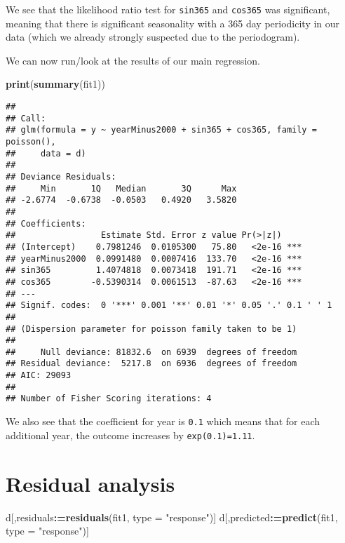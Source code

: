 \documentclass[]{book}
\newenvironment{Shaded}{\begin{snugshade}}{\end{snugshade}}
\newcommand{\KeywordTok}[1]{\textcolor[rgb]{0.13,0.29,0.53}{\textbf{#1}}}
\newcommand{\DataTypeTok}[1]{\textcolor[rgb]{0.13,0.29,0.53}{#1}}
\newcommand{\StringTok}[1]{\textcolor[rgb]{0.31,0.60,0.02}{#1}}
\newcommand{\OperatorTok}[1]{\textcolor[rgb]{0.81,0.36,0.00}{\textbf{#1}}}
\newcommand{\ErrorTok}[1]{\textcolor[rgb]{0.64,0.00,0.00}{\textbf{#1}}}
\newcommand{\NormalTok}[1]{#1}
\begin{document}
We see that the likelihood ratio test for \texttt{sin365} and
\texttt{cos365} was significant, meaning that there is significant
seasonality with a 365 day periodicity in our data (which we already
strongly suspected due to the periodogram).

\newpage

We can now run/look at the results of our main regression.

\begin{Shaded}
\begin{Highlighting}[]
\KeywordTok{print}\NormalTok{(}\KeywordTok{summary}\NormalTok{(fit1))}
\end{Highlighting}
\end{Shaded}

\begin{verbatim}
## 
## Call:
## glm(formula = y ~ yearMinus2000 + sin365 + cos365, family = poisson(), 
##     data = d)
## 
## Deviance Residuals: 
##     Min       1Q   Median       3Q      Max  
## -2.6774  -0.6738  -0.0503   0.4920   3.5820  
## 
## Coefficients:
##                 Estimate Std. Error z value Pr(>|z|)    
## (Intercept)    0.7981246  0.0105300   75.80   <2e-16 ***
## yearMinus2000  0.0991480  0.0007416  133.70   <2e-16 ***
## sin365         1.4074818  0.0073418  191.71   <2e-16 ***
## cos365        -0.5390314  0.0061513  -87.63   <2e-16 ***
## ---
## Signif. codes:  0 '***' 0.001 '**' 0.01 '*' 0.05 '.' 0.1 ' ' 1
## 
## (Dispersion parameter for poisson family taken to be 1)
## 
##     Null deviance: 81832.6  on 6939  degrees of freedom
## Residual deviance:  5217.8  on 6936  degrees of freedom
## AIC: 29093
## 
## Number of Fisher Scoring iterations: 4
\end{verbatim}

We also see that the coefficient for year is \texttt{0.1} which means
that for each additional year, the outcome increases by
\texttt{exp(0.1)=1.11}.

\newpage

\section{Residual analysis}\label{residual-analysis}

\begin{Shaded}
\begin{Highlighting}[]
\NormalTok{d[,residuals}\OperatorTok{:}\ErrorTok{=}\KeywordTok{residuals}\NormalTok{(fit1, }\DataTypeTok{type =} \StringTok{"response"}\NormalTok{)]}
\NormalTok{d[,predicted}\OperatorTok{:}\ErrorTok{=}\KeywordTok{predict}\NormalTok{(fit1, }\DataTypeTok{type =} \StringTok{"response"}\NormalTok{)]}
\end{Highlighting}
\end{Shaded}
\end{document}
